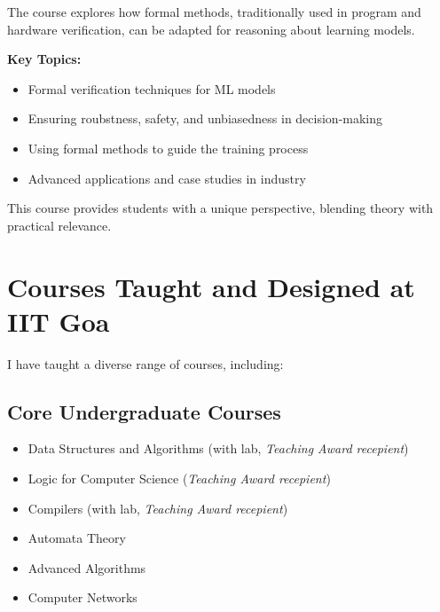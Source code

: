\documentclass[11pt,a4paper,sans]{moderncv} %
\begin{document}
The course explores how formal methods, traditionally used in program and hardware verification, can be adapted for reasoning about learning models.

\textbf{Key Topics:}
\begin{itemize}
    \item Formal verification techniques for ML models
    \item Ensuring roubstness, safety, and unbiasedness in decision-making
    \item Using formal methods to guide the training process
    \item Advanced applications and case studies in industry
\end{itemize}

This course provides students with a unique perspective, blending theory with practical relevance.

\section{Courses Taught and Designed at IIT Goa}
I have taught a diverse range of courses, including:

\subsection*{Core Undergraduate Courses}
\begin{varwidth}[t]{.8\textwidth}
\begin{itemize}
    \item Data Structures and Algorithms (with lab, \emph{Teaching Award recepient})
    \item Logic for Computer Science (\emph{Teaching Award recepient})
    \item Compilers (with lab, \emph{Teaching Award recepient})
\end{itemize}

\end{varwidth}%
\hspace{3em}%
\begin{varwidth}[t]{.5\textwidth}
 \begin{itemize}
    \item Automata Theory
    \item Advanced Algorithms
    \item Computer Networks
\end{itemize}
\end{varwidth}
\end{document}
